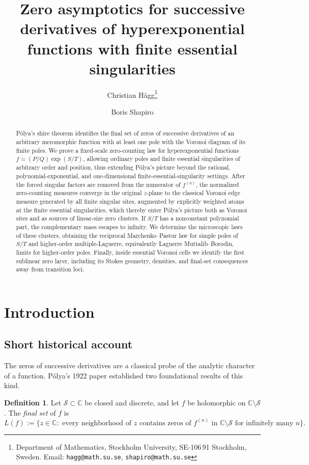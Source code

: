 \documentclass[reqno]{article}
\title{Zero asymptotics for successive derivatives of hyperexponential functions with finite essential singularities}
\author{Christian H\"agg\thanks{Department of Mathematics, Stockholm University, SE-106\,91 Stockholm, Sweden. Email: \texttt{hagg@math.su.se}, \texttt{shapiro@math.su.se}}\and Boris Shapiro\footnotemark[1]}
\date{}
\theoremstyle{definition}
\newtheorem{defn}[theorem]{Definition}
\theoremstyle{remark}
\theoremstyle{plain}
\newcommand{\C}{\mathbb C}
\begin{document}
\maketitle

\begin{abstract}
P\'olya's shire theorem identifies the final set of zeros of successive derivatives of an arbitrary meromorphic function with at least one pole with the Voronoi diagram of its finite poles. We prove a fixed-scale zero-counting law for hyperexponential functions \(f=(P/Q)\exp(S/T)\), allowing ordinary poles and finite essential singularities of arbitrary order and position, thus extending P\'olya's picture beyond the rational, polynomial-exponential, and one-dimensional finite-essential-singularity settings. After the forced singular factors are removed from the numerator of \(f^{(n)}\), the normalized zero-counting measures converge in the original \(z\)-plane to the classical Voronoi edge measure generated by all finite singular sites, augmented by explicitly weighted atoms at the finite essential singularities, which thereby enter P\'olya's picture both as Voronoi sites and as sources of linear-size zero clusters. If \(S/T\) has a nonconstant polynomial part, the complementary mass escapes to infinity. We determine the microscopic laws of these clusters, obtaining the reciprocal Marchenko--Pastur law for simple poles of \(S/T\) and higher-order multiple-Laguerre, equivalently Laguerre Muttalib--Borodin, limits for higher-order poles. Finally, inside essential Voronoi cells we identify the first sublinear zero layer, including its Stokes geometry, densities, and final-set consequences away from transition loci.
\end{abstract}

\section{Introduction}

\subsection{Short historical account}
The zeros of successive derivatives are a classical probe of the analytic character of a function. P\'olya's 1922 paper \cite{Po} established two foundational results of this kind.

\begin{defn}\label{def:finalset}
Let $\mathcal S\subset\C$ be closed and discrete, and let $f$ be holomorphic on $\C\setminus \mathcal S$. The \emph{final set} of $f$ is
$$L(f):=\{z\in\C:\text{ every neighborhood of }z\text{ contains zeros of }f^{(n)}\text{ in }\C\setminus \mathcal S\text{ for infinitely many }n\}.$$
\end{defn}
\end{document}
